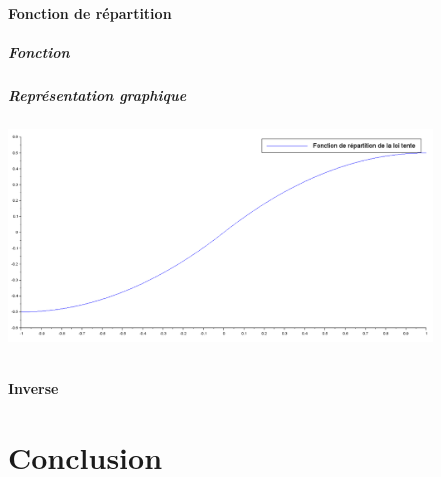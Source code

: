\documentclass{article}
\begin{document}
\paragraph{}

\subsection{Fonction de répartition}

\subsubsection{Fonction}

\subsubsection{Représentation graphique}
\begin{center}
\includegraphics[width=425px]{img/tente_repartition.png}
\end{center}
\paragraph{}

\subsection{Inverse}

\part{Conclusion}
\paragraph{}

\newpage
\appendix

\section{}

\subsection{}

\subsubsection{}
\begin{verbatim}
\end{verbatim}

\end{document}
